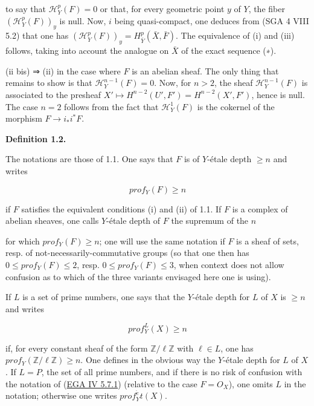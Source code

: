 \documentclass[
  11pt,
  a4paper,
]{book}
\begin{document}
to say that \(\mathcal{H}^{p}_{Y}(F) = 0\) or that, for every geometric
point \(y\) of \(Y\), the fiber \((\mathcal{H}^{p}_{Y}(F))_{y}\) is
null. Now, \(i\) being quasi-compact, one deduces from (SGA 4 VIII 5.2)
that one has
\((\mathcal{H}^{p}_{Y}(F))_{y} = H^{p}_{\bar{Y}}(\bar{X}, \bar{F})\).
The equivalence of (i) and (iii) follows, taking into account the
analogue on \(\bar{X}\) of the exact sequence (∗).

(ii bis) ⇒ (ii) in the case where \(F\) is an abelian sheaf. The only
thing that remains to show is that \(\mathcal{H}^{n-1}_{Y}(F) = 0\).
Now, for \(n > 2\), the sheaf \(\mathcal{H}^{n-1}_{Y}(F)\) is associated
to the presheaf \(X'
\mapsto H^{n-2}(U', F') = H^{n-2}(X', F')\), hence is null. The case
\(n = 2\) follows from the fact that \(\mathcal{H}^{1}_{Y}(F)\) is the
cokernel of the morphism \(F \to i_{*} i^{*} F\).

\textbf{Definition 1.2.}

The notations are those of 1.1. One says that \(F\) is of \(Y\)-étale
depth \(\geqslant n\) and writes

\[ prof_{Y}(F) \geqslant n \]

if \(F\) satisfies the equivalent conditions (i) and (ii) of 1.1. If
\(F\) is a complex of abelian sheaves, one calls \(Y\)-étale depth of
\(F\) the supremum of the \(n\)

for which \(prof_{Y}(F) \geqslant n\); one will use the same notation if
\(F\) is a sheaf of sets, resp. of not-necessarily-commutative groups
(so that one then has \(0 \leqslant prof_{Y}(F) \leqslant 2\), resp.
\(0 \leqslant
prof_{Y}(F) \leqslant 3\), when context does not allow confusion as to
which of the three variants envisaged here one is using).

If \(L\) is a set of prime numbers, one says that the \(Y\)-étale depth
for \(L\) of \(X\) is \(\geqslant n\) and writes

\[ prof^{L}_{Y}(X) \geqslant n \]

if, for every constant sheaf of the form \(\mathbb{Z}/\ell \mathbb{Z}\)
with \(\ell \in L\), one has
\(prof_{Y}(\mathbb{Z}/\ell \mathbb{Z}) \geqslant n\). One defines in the
obvious way the \(Y\)-étale depth for \(L\) of \(X\). If \(L = P\), the
set of all prime numbers, and if there is no risk of confusion with the
notation of
(\href{https://jcreinhold.github.io/ega/iv/17-ch4-05-dimension-depth-regularity.html\#57-depth-and-property-sn}{EGA
IV 5.7.1}) (relative to the case \(F = O_{X}\)), one omits \(L\) in the
notation; otherwise one writes \(prof^{\acute{e}}_{Y}t(X)\).
\end{document}
